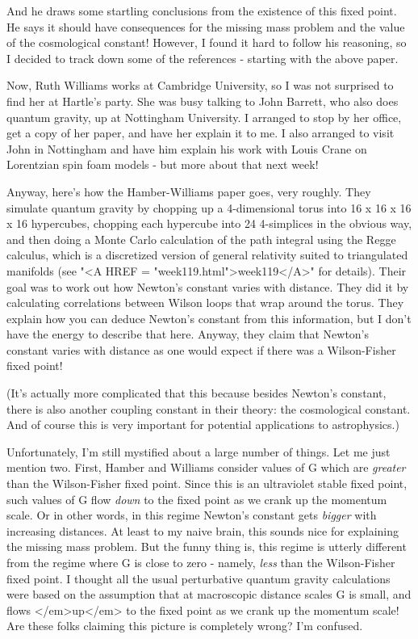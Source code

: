 And he draws some startling conclusions from the existence of
this fixed point.  He says it should have consequences for the
missing mass problem and the value of the cosmological constant!
However, I found it hard to follow his reasoning, so I decided
to track down some of the references - starting with the above
paper.  

Now, Ruth Williams works at Cambridge University, so I was not
surprised to find her at Hartle's party.  She was busy talking
to John Barrett, who also does quantum gravity, up at Nottingham
University.  I arranged to stop by her office, get a copy of her 
paper, and have her explain it to me.  I also arranged to visit
John in Nottingham and have him explain his work with Louis Crane 
on Lorentzian spin foam models - but more about that next week!

Anyway, here's how the Hamber-Williams paper goes, very roughly.  
They simulate quantum gravity by chopping up a 4-dimensional torus 
into 16 x 16 x 16 x 16 hypercubes, chopping each hypercube into 24 
4-simplices in the obvious way, and then doing a Monte Carlo calculation 
of the path integral using the Regge calculus, which is a discretized 
version of general relativity suited to triangulated manifolds (see 
"<A HREF = "week119.html">week119</A>" for details).  Their goal 
was to work out how Newton's 
constant varies with distance.  They did it by calculating correlations
between Wilson loops that wrap around the torus.  They explain how
you can deduce Newton's constant from this information, but I don't
have the energy to describe that here.  Anyway, they claim that Newton's
constant varies with distance as one would expect if there was a 
Wilson-Fisher fixed point!

(It's actually more complicated that this because besides Newton's
constant, there is also another coupling constant in their theory:
the cosmological constant.  And of course this is very important
for potential applications to astrophysics.)

Unfortunately, I'm still mystified about a large number of things.  
Let me just mention two.  First, Hamber and Williams consider values
of G which are \emph{greater} than the Wilson-Fisher fixed point.  Since
this is an ultraviolet stable fixed point, such values of G flow \emph{down}
to the fixed point as we crank up the momentum scale.  Or in other 
words, in this regime Newton's constant gets \emph{bigger} with increasing
distances.  At least to my naive brain, this sounds nice for explaining
the missing mass problem.  But the funny thing is, this regime is 
utterly different from the regime where G is close to zero - namely,
\emph{less} than the Wilson-Fisher fixed point.  I thought all the usual
perturbative quantum gravity calculations were based on the assumption
that at macroscopic distance scales G is small, and flows </em>up</em> to 
the fixed point as we crank up the momentum scale!  Are these folks 
claiming this picture is completely wrong?  I'm confused.  


